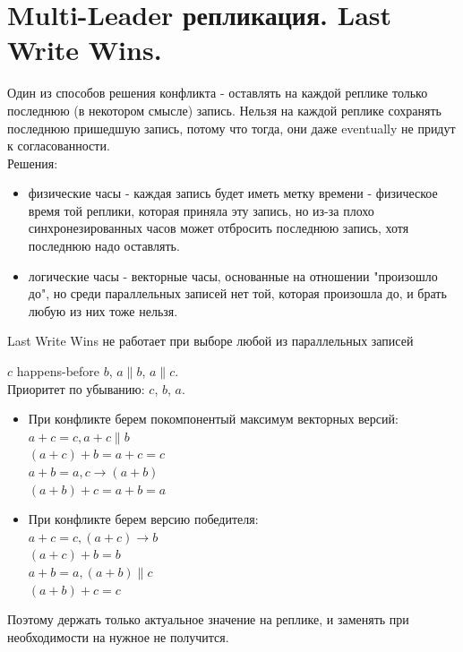\section{Multi-Leader репликация. Last Write Wins.}
    Один из способов решения конфликта - оставлять на каждой реплике только последнюю (в некотором смысле) запись. Нельзя на каждой реплике сохранять последнюю пришедшую запись, потому что тогда, они даже eventually не придут к согласованности. \\
    Решения:
    \begin{itemize}
        \item физические часы - каждая запись будет иметь метку времени - физическое время той реплики, которая приняла эту запись, но из-за плохо синхронезированных часов может отбросить последнюю запись, хотя последнюю надо оставлять.
        \item логические часы - векторные часы, основанные на отношении "произошло до", но среди параллельных записей нет той, которая произошла до, и брать любую из них тоже нельзя.
    \end{itemize}
      \begin{definition}
        Last Write Wins не работает при выборе любой из параллельных записей
      \end{definition}
          $c$ happens-before $b$, $a \parallel b$, $a \parallel c$. \\
          Приоритет по убыванию: $c$, $b$, $a$. \\
          \begin{itemize}
          \item При конфликте берем покомпонентый максимум векторных версий: \\
          $a + c = c, a + c \parallel b$\\
          $(a + c) + b = a + c = c$\\
          $a + b = a, c \rightarrow (a + b)$\\
          $(a + b) + c = a + b = a$
          \item При конфликте берем версию победителя: \\
          $a + c = c, (a + c) \rightarrow b$ \\
          $(a + c) + b = b$ \\
          $a + b = a, (a + b) \parallel c$\\
          $(a + b) + c = c$
          \end{itemize}
        Поэтому держать только актуальное значение на реплике, и заменять при необходимости на нужное не получится. \\
